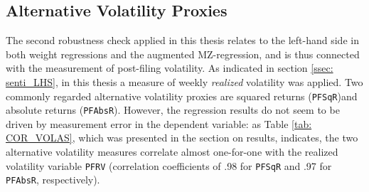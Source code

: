 \subsection{Alternative Volatility Proxies}
\label{ssec: robust_alternative-vola-proxies}
The second robustness check applied in this thesis relates to the left-hand side in both weight regressions and the augmented MZ-regression, and is thus connected with the measurement of post-filing volatility. As indicated in section \ref{ssec: senti_LHS}, in this thesis a measure of weekly \textit{realized} volatility was applied. Two commonly regarded alternative volatility proxies are squared returns (\texttt{PFSqR})and absolute returns (\texttt{PFAbsR}). However, the regression results do not seem to be driven by measurement error in the dependent variable: as Table \ref{tab: COR_VOLAS}, which was presented in the section on results, indicates, the two alternative volatility measures correlate almost one-for-one with the realized volatility variable \texttt{PFRV} (correlation coefficients of .98 for \texttt{PFSqR} and .97 for \texttt{PFAbsR}, respectively). 

